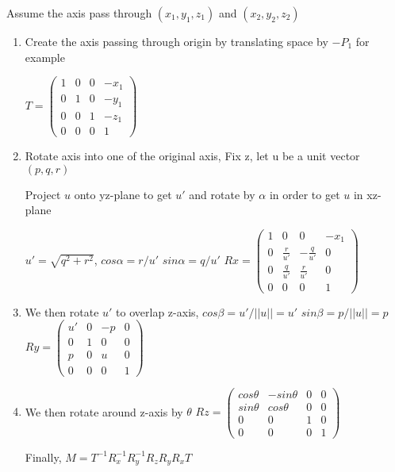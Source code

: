 \documentclass[12pt]{article}
\begin{document}
Assume the axis pass through $(x_1, y_1, z_1)$ and $(x_2, y_2, z_2)$
\begin{enumerate}[(1)]

\item
Create the axis passing through origin by translating space by $-P_1$ for example

$ T = \begin{pmatrix}
1 & 0 & 0 & -x_1\\
0 & 1 & 0 & -y_1\\
0 & 0 & 1 & -z_1\\
0 & 0 & 0 & 1
\end{pmatrix}$

\item
Rotate axis into one of the original axis, Fix z, let u be a unit vector $(p,q,r)$

Project $u$ onto yz-plane to get $u'$ and rotate by $\alpha$ in order to get $u$ in xz-plane

$u'=\sqrt{q^2+r^2}$, $cos\alpha = r/u' $ $sin\alpha = q/u'$
$ Rx = \begin{pmatrix}
1 & 0 & 0 & -x_1\\
0 & \frac{r}{u'} & -\frac{q}{u'} & 0\\
0 & \frac{q}{u'} & \frac{r}{u'} & 0\\
0 & 0 & 0 & 1
\end{pmatrix}$

\item
We then rotate $u'$ to overlap z-axis, $cos\beta = u'/||u|| = u'$ $sin\beta = p/||u|| = p $
$ Ry = \begin{pmatrix}
u' & 0 & -p & 0\\
0 & 1 & 0 & 0\\
p & 0 & u & 0\\
0 & 0 & 0 & 1
\end{pmatrix}$

\item
We then rotate around z-axis by $\theta$
$ Rz = \begin{pmatrix}
cos\theta & -sin\theta & 0 & 0\\
sin\theta & cos\theta & 0 & 0\\
0 & 0 & 1 & 0\\
0 & 0 & 0 & 1
\end{pmatrix}$

Finally, $M=T^{-1}R_x^{-1}R_y^{-1}R_zR_yR_xT$
\end{enumerate}



\end{document}
